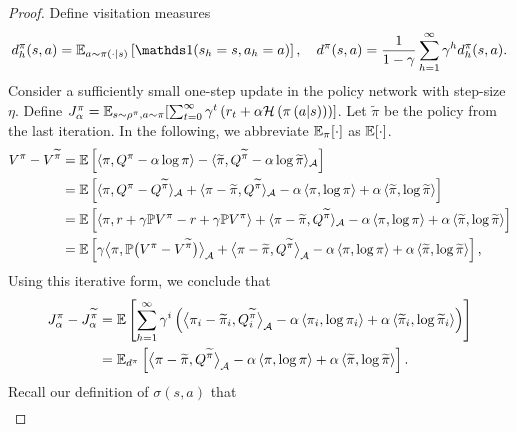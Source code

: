 \begin{proof}
Define visitation measures
\[  
d_h^\pi(s, a) = \EE_{a\sim \pi(\cdot| s)} \left[ \ind(s_h = s, a_h = a)\right], \quad d^\pi(s, a) = \frac{1}{1-\gamma}\sum_{h=1}^\infty \gamma^h d_h^\pi(s,a).
\]
Consider a sufficiently small one-step update in the policy network with step-size $\eta$.
Define $J_\alpha^\pi = \mathbb{E}_{s\sim\rho^{\pi},{a\sim\pi}}\!\left[\sum_{t=0}^{\infty} \gamma^t \left( {r_t+\alpha \mathcal{H} \left( {\pi \left( {a|s} \right) } \right) } \right) \right]$. 
Let $\tilde\pi$ be the policy from the last iteration.
In the following, we abbreviate $\mathbb{E}_\pi[\cdot]$ as $\mathbb{E}[\cdot]$. 
\begin{align*}
V^{\pi} - V^{\widetilde{\pi}}&=\mathbb{E} \left[\left\langle \pi,Q^{\pi}-\alpha\log\pi \right\rangle-\langle{\widetilde{\ensuremath{\pi}},\ensuremath{Q}^{\widetilde{\ensuremath{\pi}}}-\alpha\log\widetilde{\ensuremath{\pi}}} \rangle_{\mathcal{A}}\right]\\
&=\mathbb{E}\left[\langle{\ensuremath{\pi},\ensuremath{Q}^{\ensuremath{\pi}}-\ensuremath{Q}^{\widetilde{\ensuremath{\pi}}}}\rangle_{\mathcal{A}}+\langle{\ensuremath{\pi}-\widetilde{\ensuremath{\pi}},\ensuremath{Q}^{\widetilde{\ensuremath{\pi}}}}\rangle_{\mathcal{A}}-\alpha \left\langle \pi,\log{\ensuremath{\pi}} \right\rangle+\alpha\left\langle \widetilde{\pi},\log\widetilde{\pi} \right\rangle\right]\\
&=\mathbb{E}\left[\left\langle \pi,r+\gamma \mathbb{P}V^{\pi}-r+\gamma \mathbb{P}V^{\pi} \right\rangle+\langle \pi-\widetilde{\pi},Q^{\widetilde{\pi}}\rangle_{\mathcal{A}} -
\alpha\left\langle \pi,\log\pi \right\rangle + \alpha\left\langle \widetilde{\pi},\log \widetilde{\pi} \right\rangle\right]\\
&=\mathbb{E}\left[ \gamma\bigl\langle\pi, \mathbb{P}\bigl(V^{\pi}-V^{\widetilde{\pi}}\bigr)\bigr\rangle_{\mathcal{A}}+\bigl\langle\pi-\widetilde{\pi},Q^{\widetilde{\pi}}\bigr\rangle_{\mathcal{A}}-\alpha\left\langle \pi,\log\pi \right\rangle+\alpha\left\langle \widetilde{\pi},\log\widetilde{\pi} \right\rangle\right] , 
\end{align*}
Using this iterative form, we conclude that 
\begin{align*}
    J_\alpha^\pi - J_\alpha^{\widetilde\pi} 
    &= \mathbb{E}\left[
        \sum_{h=1}^\infty \gamma^i \left( \bigl\langle\pi_i-\widetilde{\pi}_i,Q_i^{\widetilde{\pi}}\bigr\rangle_{\mathcal{A}}-\alpha\left\langle \pi_i,\log\pi_i \right\rangle+\alpha\left\langle \widetilde{\pi}_i,\log\widetilde{\pi}_i \right\rangle  \right)
    \right] \\
    &= \mathbb{E}_{d^\pi} \left[ \bigl\langle\pi-\widetilde{\pi},Q^{\widetilde{\pi}}\bigr\rangle_{\mathcal{A}}-\alpha\left\langle \pi,\log\pi \right\rangle+\alpha\left\langle \widetilde{\pi},\log\widetilde{\pi} \right\rangle \right].
\end{align*}
Recall our definition of $\sigma(s,a)$ that 
\begin{align}

\end{align}
\end{proof}
